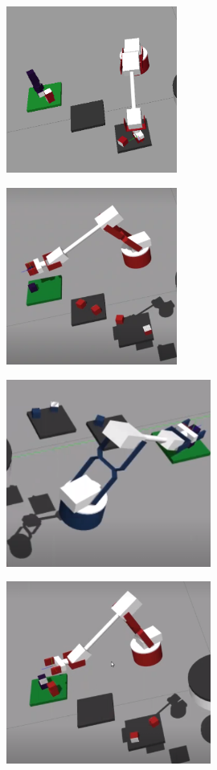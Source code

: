 \documentclass{article}
\begin{document}
\begin{figure}[h]
\centering
\includegraphics[width=0.5\textwidth]{IDEAL_STACK.png}
\caption{}
\label{ideal}
\end{figure}

\begin{figure}[h]
\centering
\includegraphics[width=0.5\textwidth]{Team_6_1Stack.png}
\caption{}
\label{t6}
\end{figure}

\begin{figure}[h]
\centering
\includegraphics[width=0.6\textwidth]{Team_7_3Stack.png}
\caption{}
\label{t7}
\end{figure}

\begin{figure}[h]
\centering
\includegraphics[width=0.6\textwidth]{Team_9_Stack.png}
\caption{}
\label{t9}
\end{figure}
\end{document}
